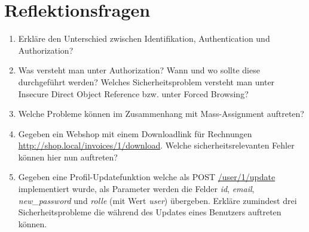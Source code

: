 \section{Reflektionsfragen}

\begin{enumerate}
	\item Erkläre den Unterschied zwischen Identifikation, Authentication und Authorization?
	\item Was versteht man unter Authorization? Wann und wo sollte diese durchgeführt werden? Welches Sicherheitsproblem versteht man unter Insecure Direct Object Reference bzw. unter Forced Browsing?
	\item Welche Probleme können im Zusammenhang mit Mass-Assignment auftreten?
	\item Gegeben ein Webshop mit einem Downloadlink für Rechnungen \url{http://shop.local/invoices/1/download}. Welche sicherheitsrelevanten Fehler können hier nun auftreten?
	\item Gegeben eine Profil-Updatefunktion welche als POST \url{/user/1/update} implementiert wurde, als Parameter werden die Felder \textit{id}, \textit{email}, \textit{new\_password} und \textit{rolle} (mit Wert \textit{user}) übergeben. Erkläre zumindest drei Sicherheitsprobleme die während des Updates eines Benutzers auftreten können.
\end{enumerate}

